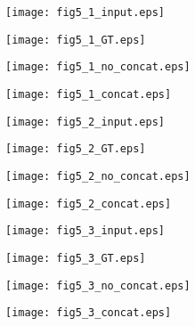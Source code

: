 \documentclass[runningheads]{llncs}
\begin{document}
\begin{figure}[p]
\centering
    \begin{minipage}{.22\textwidth}
        \centering
        \texttt{[image: fig5\_1\_input.eps]}
    \end{minipage}\begin{minipage}{0.25\textwidth}
        \centering
        \texttt{[image: fig5\_1\_GT.eps]}
    \end{minipage}
    \begin{minipage}{0.25\textwidth}
        \centering
        \texttt{[image: fig5\_1\_no\_concat.eps]}
    \end{minipage}
    \begin{minipage}{0.25\textwidth}
        \centering
        \texttt{[image: fig5\_1\_concat.eps]}
    \end{minipage}

    \begin{minipage}{.22\textwidth}
        \centering
        \texttt{[image: fig5\_2\_input.eps]}
    \end{minipage}\begin{minipage}{0.25\textwidth}
        \centering
        \texttt{[image: fig5\_2\_GT.eps]}
    \end{minipage}
    \begin{minipage}{0.25\textwidth}
        \centering
        \texttt{[image: fig5\_2\_no\_concat.eps]}
    \end{minipage}
    \begin{minipage}{0.25\textwidth}
        \centering
        \texttt{[image: fig5\_2\_concat.eps]}
    \end{minipage}

    \begin{minipage}{.22\textwidth}
        \centering
        \texttt{[image: fig5\_3\_input.eps]}
    \end{minipage}\begin{minipage}{0.25\textwidth}
        \centering
        \texttt{[image: fig5\_3\_GT.eps]}
    \end{minipage}
    \begin{minipage}{0.25\textwidth}
        \centering
        \texttt{[image: fig5\_3\_no\_concat.eps]}
    \end{minipage}
    \begin{minipage}{0.25\textwidth}
        \centering
        \texttt{[image: fig5\_3\_concat.eps]}
    \end{minipage}


\end{figure}
\end{document}
